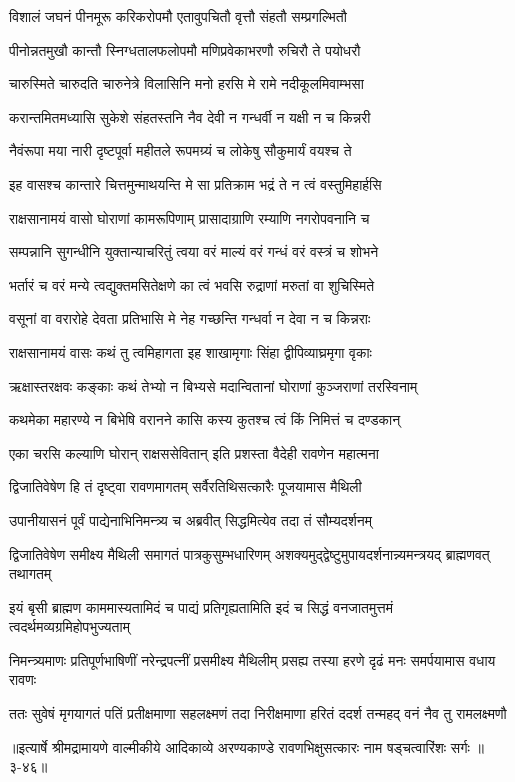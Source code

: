 \twolineshloka
{विशालं जघनं पीनमूरू करिकरोपमौ}
{एतावुपचितौ वृत्तौ संहतौ सम्प्रगल्भितौ} %

\twolineshloka
{पीनोन्नतमुखौ कान्तौ स्निग्धतालफलोपमौ}
{मणिप्रवेकाभरणौ रुचिरौ ते पयोधरौ} %

\twolineshloka
{चारुस्मिते चारुदति चारुनेत्रे विलासिनि}
{मनो हरसि मे रामे नदीकूलमिवाम्भसा} %

\twolineshloka
{करान्तमितमध्यासि सुकेशे संहतस्तनि}
{नैव देवी न गन्धर्वी न यक्षी न च किन्नरी} %

\twolineshloka
{नैवंरूपा मया नारी दृष्टपूर्वा महीतले}
{रूपमग्र्यं च लोकेषु सौकुमार्यं वयश्च ते} %

\twolineshloka
{इह वासश्च कान्तारे चित्तमुन्माथयन्ति मे}
{सा प्रतिक्राम भद्रं ते न त्वं वस्तुमिहार्हसि} %

\twolineshloka
{राक्षसानामयं वासो घोराणां कामरूपिणाम्}
{प्रासादाग्राणि रम्याणि नगरोपवनानि च} %

\twolineshloka
{सम्पन्नानि सुगन्धीनि युक्तान्याचरितुं त्वया}
{वरं माल्यं वरं गन्धं वरं वस्त्रं च शोभने} %

\twolineshloka
{भर्तारं च वरं मन्ये त्वद्युक्तमसितेक्षणे}
{का त्वं भवसि रुद्राणां मरुतां वा शुचिस्मिते} %

\twolineshloka
{वसूनां वा वरारोहे देवता प्रतिभासि मे}
{नेह गच्छन्ति गन्धर्वा न देवा न च किन्नराः} %

\twolineshloka
{राक्षसानामयं वासः कथं तु त्वमिहागता}
{इह शाखामृगाः सिंहा द्वीपिव्याघ्रमृगा वृकाः} %

\twolineshloka
{ऋक्षास्तरक्षवः कङ्काः कथं तेभ्यो न बिभ्यसे}
{मदान्वितानां घोराणां कुञ्जराणां तरस्विनाम्} %

\twolineshloka
{कथमेका महारण्ये न बिभेषि वरानने}
{कासि कस्य कुतश्च त्वं किं निमित्तं च दण्डकान्} %

\twolineshloka
{एका चरसि कल्याणि घोरान् राक्षससेवितान्}
{इति प्रशस्ता वैदेही रावणेन महात्मना} %

\twolineshloka
{द्विजातिवेषेण हि तं दृष्ट्वा रावणमागतम्}
{सर्वैरतिथिसत्कारैः पूजयामास मैथिली} %

\twolineshloka
{उपानीयासनं पूर्वं पाद्येनाभिनिमन्त्र्य च}
{अब्रवीत् सिद्धमित्येव तदा तं सौम्यदर्शनम्} %

\twolineshloka
{द्विजातिवेषेण समीक्ष्य मैथिली समागतं पात्रकुसुम्भधारिणम्}
{अशक्यमुद्द्वेष्टुमुपायदर्शनान्न्यमन्त्रयद् ब्राह्मणवत् तथागतम्} %

\twolineshloka
{इयं बृसी ब्राह्मण काममास्यतामिदं च पाद्यं प्रतिगृह्यतामिति}
{इदं च सिद्धं वनजातमुत्तमं त्वदर्थमव्यग्रमिहोपभुज्यताम्} %

\twolineshloka
{निमन्त्र्यमाणः प्रतिपूर्णभाषिणीं नरेन्द्रपत्नीं प्रसमीक्ष्य मैथिलीम्}
{प्रसह्य तस्या हरणे दृढं मनः समर्पयामास वधाय रावणः} %

\twolineshloka
{ततः सुवेषं मृगयागतं पतिं प्रतीक्षमाणा सहलक्ष्मणं तदा}
{निरीक्षमाणा हरितं ददर्श तन्महद् वनं नैव तु रामलक्ष्मणौ} %


॥इत्यार्षे श्रीमद्रामायणे वाल्मीकीये आदिकाव्ये अरण्यकाण्डे रावणभिक्षुसत्कारः नाम षड्चत्वारिंशः सर्गः ॥३-४६॥
